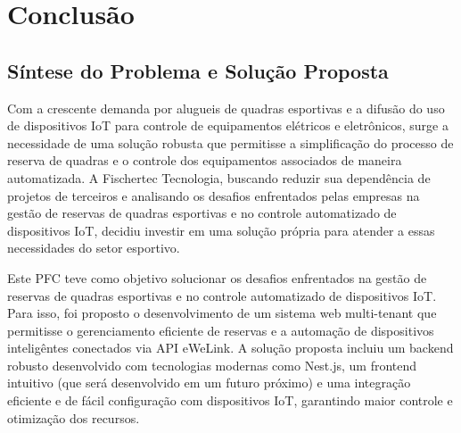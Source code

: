 \chapter{Conclusão}\label{cap:conclusao}



\section{Síntese do Problema e Solução Proposta}


Com a crescente demanda por alugueis de quadras esportivas e a difusão do uso de dispositivos \acrshort{IoT} para controle de equipamentos elétricos e eletrônicos, surge a necessidade de uma solução robusta que permitisse a simplificação do processo de reserva de quadras e o controle dos equipamentos associados de maneira automatizada.
A Fischertec Tecnologia, buscando reduzir sua dependência de projetos de terceiros e analisando os desafios enfrentados pelas empresas na gestão de reservas de quadras esportivas e no controle automatizado de dispositivos \acrshort{IoT}, decidiu investir em uma solução própria para atender a essas necessidades do setor esportivo.

Este \acrshort{PFC} teve como objetivo solucionar os desafios enfrentados na gestão de reservas de quadras esportivas e no controle automatizado de dispositivos \acrshort{IoT}. Para isso, foi proposto o desenvolvimento de um sistema web multi-tenant que permitisse o gerenciamento eficiente de reservas e a automação de dispositivos inteligêntes conectados via API eWeLink. A solução proposta incluiu um backend robusto desenvolvido com tecnologias modernas como Nest.js, um frontend intuitivo (que será desenvolvido em um futuro próximo) e uma integração eficiente e de fácil configuração com dispositivos \acrshort{IoT}, garantindo maior controle e otimização dos recursos.

